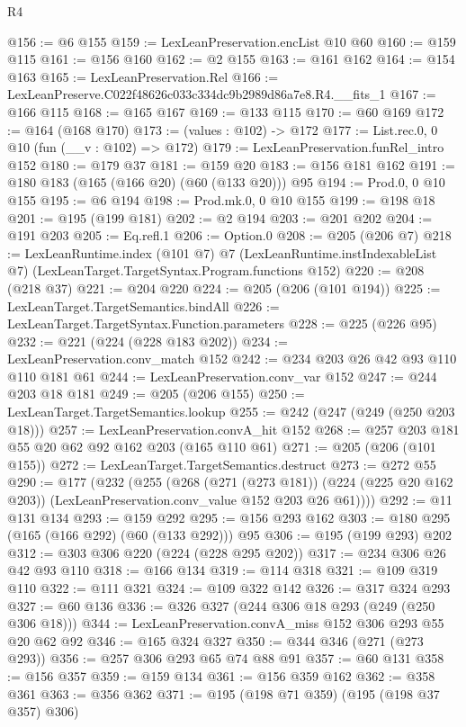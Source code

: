 \begin{lexlean}{R4}
\begin{coremodule}
@156 := @6 @155
@159 := LexLeanPreservation.encList @10 @60
@160 := @159 @115
@161 := @156 @160
@162 := @2 @155
@163 := @161 @162
@164 := @154 @163
@165 := LexLeanPreservation.Rel
@166 := LexLeanPreserve.C022f48626c033c334dc9b2989d86a7e8.R4.__fits_1
@167 := @166 @115
@168 := @165 @167
@169 := @133 @115
@170 := @60 @169
@172 := @164 (@168 @170)
@173 := (values : @102) -> @172
@177 := List.rec.{0, 0} @10 (fun (__v : @102) => @172)
@179 := LexLeanPreservation.funRel_intro @152
@180 := @179 @37
@181 := @159 @20
@183 := @156 @181 @162
@191 := @180 @183 (@165 (@166 @20) (@60 (@133 @20))) @95
@194 := Prod.{0, 0} @10 @155
@195 := @6 @194
@198 := Prod.mk.{0, 0} @10 @155
@199 := @198 @18
@201 := @195 (@199 @181)
@202 := @2 @194
@203 := @201 @202
@204 := @191 @203
@205 := Eq.refl.{1}
@206 := Option.{0}
@208 := @205 (@206 @7)
@218 := LexLeanRuntime.index
    (@101 @7)
    @7
    (LexLeanRuntime.instIndexableList @7)
    (LexLeanTarget.TargetSyntax.Program.functions @152)
@220 := @208 (@218 @37)
@221 := @204 @220
@224 := @205 (@206 (@101 @194))
@225 := LexLeanTarget.TargetSemantics.bindAll
@226 := LexLeanTarget.TargetSyntax.Function.parameters
@228 := @225 (@226 @95)
@232 := @221 (@224 (@228 @183 @202))
@234 := LexLeanPreservation.conv_match @152
@242 := @234 @203 @26 @42 @93 @110 @110 @181 @61
@244 := LexLeanPreservation.conv_var @152
@247 := @244 @203 @18 @181
@249 := @205 (@206 @155)
@250 := LexLeanTarget.TargetSemantics.lookup
@255 := @242 (@247 (@249 (@250 @203 @18)))
@257 := LexLeanPreservation.convA_hit @152
@268 := @257 @203 @181 @55 @20 @62 @92 @162 @203 (@165 @110 @61)
@271 := @205 (@206 (@101 @155))
@272 := LexLeanTarget.TargetSemantics.destruct
@273 := @272 @55
@290 := @177
    (@232
      (@255
        (@268
          (@271 (@273 @181))
          (@224 (@225 @20 @162 @203))
          (LexLeanPreservation.conv_value @152 @203 @26 @61))))
@292 := @11 @131 @134
@293 := @159 @292
@295 := @156 @293 @162
@303 := @180 @295 (@165 (@166 @292) (@60 (@133 @292))) @95
@306 := @195 (@199 @293) @202
@312 := @303 @306 @220 (@224 (@228 @295 @202))
@317 := @234 @306 @26 @42 @93 @110
@318 := @166 @134
@319 := @114 @318
@321 := @109 @319 @110
@322 := @111 @321
@324 := @109 @322 @142
@326 := @317 @324 @293
@327 := @60 @136
@336 := @326 @327 (@244 @306 @18 @293 (@249 (@250 @306 @18)))
@344 := LexLeanPreservation.convA_miss @152 @306 @293 @55 @20 @62 @92
@346 := @165 @324 @327
@350 := @344 @346 (@271 (@273 @293))
@356 := @257 @306 @293 @65 @74 @88 @91
@357 := @60 @131
@358 := @156 @357
@359 := @159 @134
@361 := @156 @359 @162
@362 := @358 @361
@363 := @356 @362
@371 := @195 (@198 @71 @359) (@195 (@198 @37 @357) @306)

\end{coremodule}
\end{lexlean}
